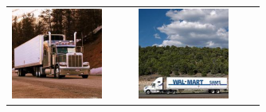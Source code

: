 \begin{figure}[h]
\begin{tabular}{|p{0.4\linewidth}p{0.4\linewidth}|}
\includegraphics[width=\linewidth,frame]{figures/examples_assests/clustering/2_1.pdf} & 
\includegraphics[width=\linewidth,frame]{figures/examples_assests/clustering/2_2.pdf} \\

\end{tabular}
\end{figure}
